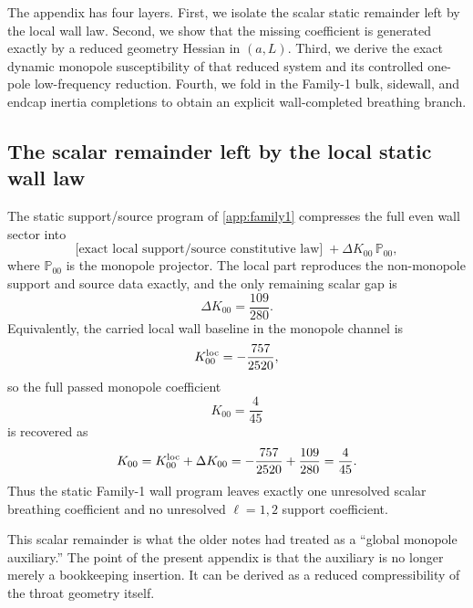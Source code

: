 \documentclass[11pt]{article}
\begin{document}
The appendix has four layers.
First, we isolate the scalar static remainder left by the local wall law.
Second, we show that the missing coefficient is generated exactly by a reduced geometry
Hessian in \((a,L)\).
Third, we derive the exact dynamic monopole susceptibility of that reduced system and its
controlled one-pole low-frequency reduction.
Fourth, we fold in the Family-1 bulk, sidewall, and endcap inertia completions to obtain
an explicit wall-completed breathing branch.

\subsection{The scalar remainder left by the local static wall law}
\label{app:geom-breathing-static-gap}

The static support/source program of \cref{app:family1} compresses the full even wall
sector into
\begin{equation}
\text{[exact local support/source constitutive law]}
\;+
\Delta K_{00}\,\mathbb P_{00},
\label{eq:geom-breathing-local-plus-mono}
\end{equation}
where \(\mathbb P_{00}\) is the monopole projector.
The local part reproduces the non-monopole support and source data exactly, and the only
remaining scalar gap is
\begin{equation}
\Delta K_{00}=\frac{109}{280}.
\label{eq:geom-breathing-109-280}
\end{equation}
Equivalently, the carried local wall baseline in the monopole channel is
\begin{equation}
K_{00}^{\rm loc}=-\frac{757}{2520},
\label{eq:geom-breathing-K00loc}
\end{equation}
so the full passed monopole coefficient
\begin{equation}
K_{00}=\frac{4}{45}
\label{eq:geom-breathing-K00target}
\end{equation}
is recovered as
\begin{equation}
K_{00}=K_{00}^{\rm loc}+\Delta K_{00}
=-\frac{757}{2520}+\frac{109}{280}
=\frac{4}{45}.
\label{eq:geom-breathing-K00-split}
\end{equation}
Thus the static Family-1 wall program leaves exactly one unresolved scalar breathing
coefficient and no unresolved \(\ell=1,2\) support coefficient.

This scalar remainder is what the older notes had treated as a ``global monopole
auxiliary.''
The point of the present appendix is that the auxiliary is no longer merely a bookkeeping
insertion.
It can be derived as a reduced compressibility of the throat geometry itself.
\end{document}
